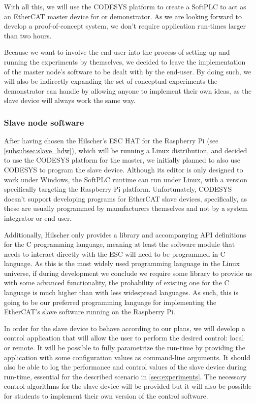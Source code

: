 With all this, we will use the CODESYS platform to create a SoftPLC to act as an EtherCAT master device for or demonstrator.
As we are looking forward to develop a proof-of-concept system, we don't require application run-times larger than two hours.

Because we want to involve the end-user into the process of setting-up and running the experiments by themselves, we decided to leave the implementation of the master node's software to be dealt with by the end-user.
By doing such, we will also be indirectly expanding the set of conceptual experiments the demonstrator can handle by allowing anyone to implement their own ideas, as the slave device will always work the same way.

\subsubsection{Slave node software}

After having chosen the Hilscher's ESC HAT for the Raspberry Pi (see \autoref{subsubsec:slave_hdw}), which will be running a Linux distribution, and decided to use the CODESYS platform for the master, we initially planned to also use CODESYS to program the slave device.
Although its editor is only designed to work under Windows, the SoftPLC runtime can run under Linux, with a version specifically targeting the Raspberry Pi platform.
Unfortunately, CODESYS doesn't support developing programs for EtherCAT slave devices, specifically, as these are usually programmed by manufacturers themselves and not by a system integrator or end-user.

Additionally, Hilscher only provides a library and accompanying API definitions for the C programming language, meaning at least the software module that needs to interact directly with the ESC will need to be programmed in C language.
As this is the most widely used programming language in the Linux universe, if during development we conclude we require some library to provide us with some advanced functionality, the probability of existing one for the C language is much higher than with less widespread languages.
As such, this is going to be our preferred programming language for implementing the EtherCAT's slave software running on the Raspberry Pi.

In order for the slave device to behave according to our plans, we will develop a control application that will allow the user to perform the desired control: local or remote.
It will be possible to fully parametrize the run-time by providing the application with some configuration values as command-line arguments.
It should also be able to log the performance and control values of the slave device during run-time, essential for the described scenario in \autoref{sec:experiments}.
The necessary control algorithms for the slave device will be provided but it will also be possible for students to implement their own version of the control software.
